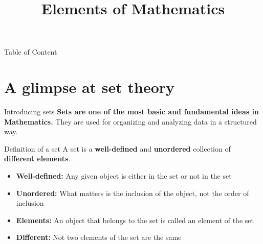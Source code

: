 \documentclass[9pt]{beamer}
\title{\Huge Elements of Mathematics}
\begin{document}
\maketitle

{
\begin{frame}{Table of Content} 
    \tableofcontents
\end{frame}
}

\section{A glimpse at set theory}

\begin{frame}{Introducing sets}
    \textbf{Sets are one of the most basic and fundamental ideas in Mathematics.} They are used for organizing and analyzing data in a structured way. 
    \vspace{0.5cm}
    
    \begin{block}{Definition of a set}
        A set is a \textbf{well-defined} and \textbf{unordered} collection of \textbf{different elements}.
        \begin{itemize}[leftmargin = 0.5cm, label = $\bullet$, rightmargin = 0.2cm]
            \item \textbf{Well-defined:} Any given object is either in the set or not in the set
            \item \textbf{Unordered:} What matters is the inclusion of the object, not the order of inclusion
            \item \textbf{Elements:} An object that belongs to the set is called an element of the set
            \item \textbf{Different:} Not two elements of the set are the same
        \end{itemize}
    \end{block}
\end{frame}
\end{document}
